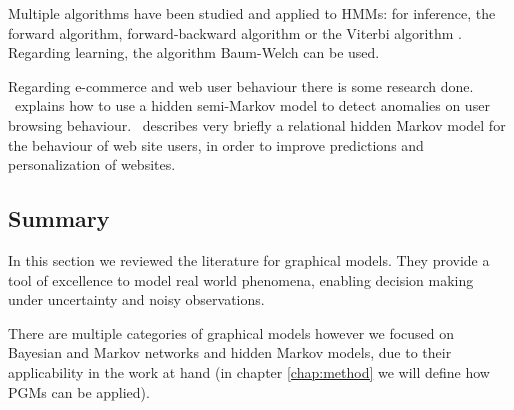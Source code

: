 Multiple algorithms have been studied and applied to HMMs: for inference, the 
forward algorithm, forward-backward algorithm \cite{baum1967inequality} or the 
Viterbi algorithm \cite{forney2005viterbi, martin2000speech}. Regarding 
learning, the algorithm Baum-Welch \cite{Baum1966, baum1967inequality} can be 
used.

Regarding e-commerce and web user behaviour there is some research done. 
\cite{Xie2009}~explains how to use a hidden semi-Markov model to detect 
anomalies on user browsing behaviour. \cite{Anderson2002}~describes very 
briefly a relational hidden Markov model for the behaviour of web site users, 
in order to improve predictions and personalization of websites.

\subsection{Summary}

In this section we reviewed the literature for graphical models. They provide a 
tool of excellence to model real world phenomena, enabling decision making 
under uncertainty and noisy observations.

There are multiple categories of graphical models however we focused on 
Bayesian and Markov networks and hidden Markov models, due to their 
applicability in the work at hand (in chapter \ref{chap:method} we will define 
how PGMs can be applied).
